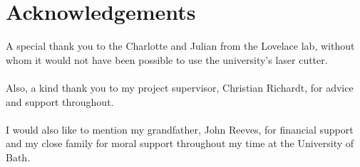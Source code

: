 \chapter*{Acknowledgements}
A special thank you to the Charlotte and Julian from the Lovelace lab, without whom it would not have been possible to use the university's laser cutter.
\\\\
Also, a kind thank you to my project supervisor, Christian Richardt, for advice and support throughout.
\\\\
I would also like to mention my grandfather, John Reeves, for financial support and my close family for moral support throughout my time at the University of Bath.